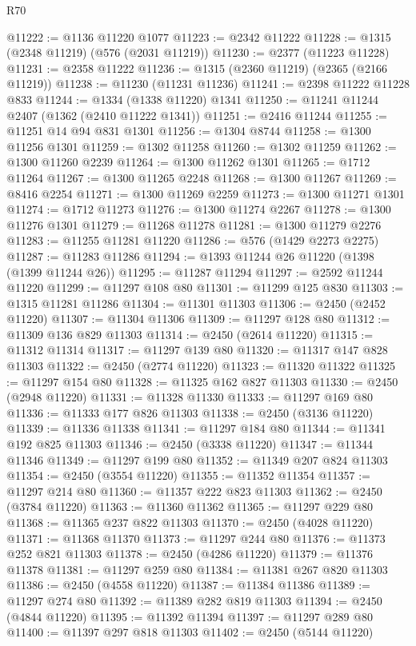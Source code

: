 \begin{lexlean}{R70}
\begin{coremodule}
@11222 := @1136 @11220 @1077
@11223 := @2342 @11222
@11228 := @1315 (@2348 @11219) (@576 (@2031 @11219))
@11230 := @2377 (@11223 @11228)
@11231 := @2358 @11222
@11236 := @1315 (@2360 @11219) (@2365 (@2166 @11219))
@11238 := @11230 (@11231 @11236)
@11241 := @2398 @11222 @11228 @833
@11244 := @1334 (@1338 @11220) @1341
@11250 := @11241 @11244 @2407 (@1362 (@2410 @11222 @1341))
@11251 := @2416 @11244
@11255 := @11251 @14 @94 @831 @1301
@11256 := @1304 @8744
@11258 := @1300 @11256 @1301
@11259 := @1302 @11258
@11260 := @1302 @11259
@11262 := @1300 @11260 @2239
@11264 := @1300 @11262 @1301
@11265 := @1712 @11264
@11267 := @1300 @11265 @2248
@11268 := @1300 @11267
@11269 := @8416 @2254
@11271 := @1300 @11269 @2259
@11273 := @1300 @11271 @1301
@11274 := @1712 @11273
@11276 := @1300 @11274 @2267
@11278 := @1300 @11276 @1301
@11279 := @11268 @11278
@11281 := @1300 @11279 @2276
@11283 := @11255 @11281 @11220
@11286 := @576 (@1429 @2273 @2275)
@11287 := @11283 @11286
@11294 := @1393 @11244 @26 @11220 (@1398 (@1399 @11244 @26))
@11295 := @11287 @11294
@11297 := @2592 @11244 @11220
@11299 := @11297 @108 @80
@11301 := @11299 @125 @830
@11303 := @1315 @11281 @11286
@11304 := @11301 @11303
@11306 := @2450 (@2452 @11220)
@11307 := @11304 @11306
@11309 := @11297 @128 @80
@11312 := @11309 @136 @829 @11303
@11314 := @2450 (@2614 @11220)
@11315 := @11312 @11314
@11317 := @11297 @139 @80
@11320 := @11317 @147 @828 @11303
@11322 := @2450 (@2774 @11220)
@11323 := @11320 @11322
@11325 := @11297 @154 @80
@11328 := @11325 @162 @827 @11303
@11330 := @2450 (@2948 @11220)
@11331 := @11328 @11330
@11333 := @11297 @169 @80
@11336 := @11333 @177 @826 @11303
@11338 := @2450 (@3136 @11220)
@11339 := @11336 @11338
@11341 := @11297 @184 @80
@11344 := @11341 @192 @825 @11303
@11346 := @2450 (@3338 @11220)
@11347 := @11344 @11346
@11349 := @11297 @199 @80
@11352 := @11349 @207 @824 @11303
@11354 := @2450 (@3554 @11220)
@11355 := @11352 @11354
@11357 := @11297 @214 @80
@11360 := @11357 @222 @823 @11303
@11362 := @2450 (@3784 @11220)
@11363 := @11360 @11362
@11365 := @11297 @229 @80
@11368 := @11365 @237 @822 @11303
@11370 := @2450 (@4028 @11220)
@11371 := @11368 @11370
@11373 := @11297 @244 @80
@11376 := @11373 @252 @821 @11303
@11378 := @2450 (@4286 @11220)
@11379 := @11376 @11378
@11381 := @11297 @259 @80
@11384 := @11381 @267 @820 @11303
@11386 := @2450 (@4558 @11220)
@11387 := @11384 @11386
@11389 := @11297 @274 @80
@11392 := @11389 @282 @819 @11303
@11394 := @2450 (@4844 @11220)
@11395 := @11392 @11394
@11397 := @11297 @289 @80
@11400 := @11397 @297 @818 @11303
@11402 := @2450 (@5144 @11220)

\end{coremodule}
\end{lexlean}
